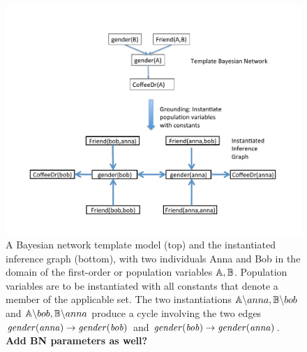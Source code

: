 \documentclass[runningheads,a4paper]{llncs}
\begin{document}
\begin{table}[htdp]
\caption{Dependency Networks vs. Bayesian Networks}
\begin{center}
\end{center}
\label{table:bn-dn}
\end{table}%
 
 

\begin{figure}[htbp]
\begin{center}
\includegraphics[width = 0.7 \textwidth]{figures/bn}
\caption{A Bayesian network template model (top) and the instantiated inference graph (bottom), with two individuals Anna and Bob in the domain of the first-order or population variables $\mathbb{A},\mathbb{B}$. Population variables are to be instantiated with all constants that denote a member of the applicable set. The two instantiations $\mathbb{A}\backslash anna,\mathbb{B} \backslash bob$ and $\mathbb{A}\backslash bob,\mathbb{B}\backslash anna$ produce a cycle involving the two  edges $\it{gender}(anna) \rightarrow \it{gender}(bob)$ and $\it{gender}(bob) \rightarrow \it{gender}(anna)$. \label{fig:bn} \textbf{Add BN parameters as well?}}
\end{center}
\end{figure}
\end{document}
